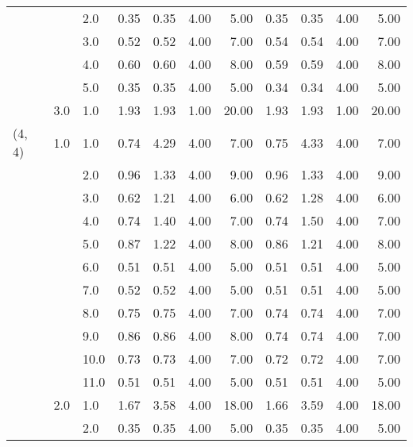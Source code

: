 \begin{tabular}{lllrrrrrrrr}
       &     & 2.0  &       0.35 &      0.35 & 4.00 &   5.00 &       0.35 &      0.35 & 4.00 &   5.00 \\
       &     & 3.0  &       0.52 &      0.52 & 4.00 &   7.00 &       0.54 &      0.54 & 4.00 &   7.00 \\
       &     & 4.0  &       0.60 &      0.60 & 4.00 &   8.00 &       0.59 &      0.59 & 4.00 &   8.00 \\
       &     & 5.0  &       0.35 &      0.35 & 4.00 &   5.00 &       0.34 &      0.34 & 4.00 &   5.00 \\
       & 3.0 & 1.0  &       1.93 &      1.93 & 1.00 &  20.00 &       1.93 &      1.93 & 1.00 &  20.00 \\
(4, 4) & 1.0 & 1.0  &       0.74 &      4.29 & 4.00 &   7.00 &       0.75 &      4.33 & 4.00 &   7.00 \\
       &     & 2.0  &       0.96 &      1.33 & 4.00 &   9.00 &       0.96 &      1.33 & 4.00 &   9.00 \\
       &     & 3.0  &       0.62 &      1.21 & 4.00 &   6.00 &       0.62 &      1.28 & 4.00 &   6.00 \\
       &     & 4.0  &       0.74 &      1.40 & 4.00 &   7.00 &       0.74 &      1.50 & 4.00 &   7.00 \\
       &     & 5.0  &       0.87 &      1.22 & 4.00 &   8.00 &       0.86 &      1.21 & 4.00 &   8.00 \\
       &     & 6.0  &       0.51 &      0.51 & 4.00 &   5.00 &       0.51 &      0.51 & 4.00 &   5.00 \\
       &     & 7.0  &       0.52 &      0.52 & 4.00 &   5.00 &       0.51 &      0.51 & 4.00 &   5.00 \\
       &     & 8.0  &       0.75 &      0.75 & 4.00 &   7.00 &       0.74 &      0.74 & 4.00 &   7.00 \\
       &     & 9.0  &       0.86 &      0.86 & 4.00 &   8.00 &       0.74 &      0.74 & 4.00 &   7.00 \\
       &     & 10.0 &       0.73 &      0.73 & 4.00 &   7.00 &       0.72 &      0.72 & 4.00 &   7.00 \\
       &     & 11.0 &       0.51 &      0.51 & 4.00 &   5.00 &       0.51 &      0.51 & 4.00 &   5.00 \\
       & 2.0 & 1.0  &       1.67 &      3.58 & 4.00 &  18.00 &       1.66 &      3.59 & 4.00 &  18.00 \\
       &     & 2.0  &       0.35 &      0.35 & 4.00 &   5.00 &       0.35 &      0.35 & 4.00 &   5.00 \\

\end{tabular}
